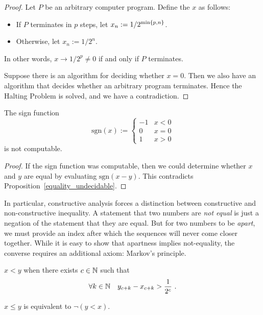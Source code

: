 \documentclass[leqno]{report}
\begin{document}
\begin{proof}
    Let $P$ be an arbitrary computer program. Define the \FCCS{} $x$ as follows:
    \begin{itemize}
        \item If $P$ terminates in $p$ steps, let $x_n := 1/2^{\min\left\{ p, n \right\}}$.
        \item Otherwise, let $x_n := 1/2^n$.
    \end{itemize}
    In other words, $x \rightarrow 1/2^p \neq 0$ if and only if $P$ terminates.

    Suppose there is an algorithm for deciding whether $x = 0$. Then we also have an algorithm that decides whether an arbitrary program terminates. Hence the Halting Problem is solved, and we have a contradiction.
\end{proof}

\begin{Corollary}
    The sign function
    \[
        \mathrm{sgn}(x) := \begin{cases}
            -1 & x < 0 \\
            0 & x = 0 \\
            1 & x > 0
        \end{cases}
    \]
    is not computable.
\end{Corollary}

\begin{proof}
    If the sign function was computable, then we could determine whether $x$ and $y$ are equal by evaluating $\mathrm{sgn}(x - y)$. This contradicts Proposition~\ref{equality_undecidable}.
\end{proof}

In particular, constructive analysis forces a distinction between constructive and non-constructive inequality. A statement that two numbers are \textit{not equal} is just a negation of the statement that they are equal. But for two numbers to be \textit{apart}, we must provide an index after which the sequences will never come closer together. While it is easy to show that apartness implies not-equality, the converse requires an additional axiom: Markov's principle.

\begin{Definition}[Ordering]
    $x < y$ when there exists $c \in \mathbb{N}$ such that
    \[ \forall {k \in \mathbb{N}} \quad {y_{c+k} - x_{c+k} > \frac{1}{2^c}} \ . \]

    $x \leq y$ is equivalent to $\neg (y < x)$.
\end{Definition}
\end{document}
